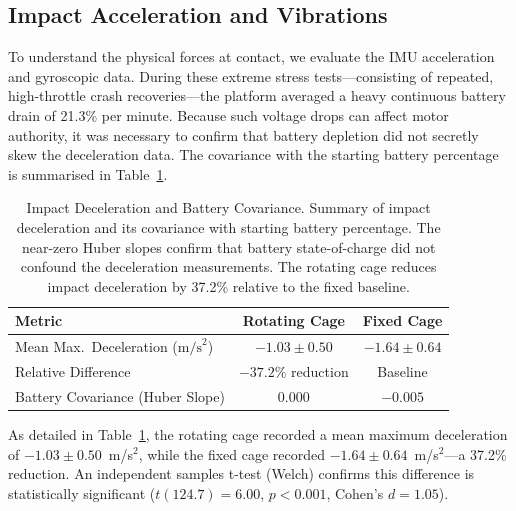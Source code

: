 \subsection{Impact Acceleration and Vibrations}
\label{sec:impact_acceleration_vibrations}

To understand the physical forces at contact, we evaluate the IMU acceleration and gyroscopic data. During these extreme stress tests---consisting of repeated, high-throttle crash recoveries---the platform averaged a heavy continuous battery drain of 21.3\% per minute. Because such voltage drops can affect motor authority, it was necessary to confirm that battery depletion did not secretly skew the deceleration data. The covariance with the starting battery percentage is summarised in Table~\ref{tab:deceleration_battery}.\label{sec:efficiency_baseline}

\begin{table}[h!]
\centering
\caption{Impact Deceleration and Battery Covariance. Summary of impact deceleration and its covariance with starting battery percentage. The near-zero Huber slopes confirm that battery state-of-charge did not confound the deceleration measurements. The rotating cage reduces impact deceleration by 37.2\% relative to the fixed baseline.}
\label{tab:deceleration_battery}
\begin{tabular}{lcc}
\toprule
\textbf{Metric} & \textbf{Rotating Cage} & \textbf{Fixed Cage} \\
\midrule
Mean Max.\ Deceleration ($\text{m/s}^2$) & $-1.03 \pm 0.50$ & $-1.64 \pm 0.64$ \\
Relative Difference & $-37.2\%$ reduction & Baseline \\
Battery Covariance (Huber Slope) & $0.000$ & $-0.005$ \\
\bottomrule
\end{tabular}
\end{table}

As detailed in Table~\ref{tab:deceleration_battery}, the rotating cage recorded a mean maximum deceleration of $-1.03 \pm 0.50$~m/s$^2$, while the fixed cage recorded $-1.64 \pm 0.64$~m/s$^2$---a 37.2\% reduction. An independent samples t-test (Welch) confirms this difference is statistically significant ($t(124.7) = 6.00$, $p < 0.001$, Cohen's $d = 1.05$).



